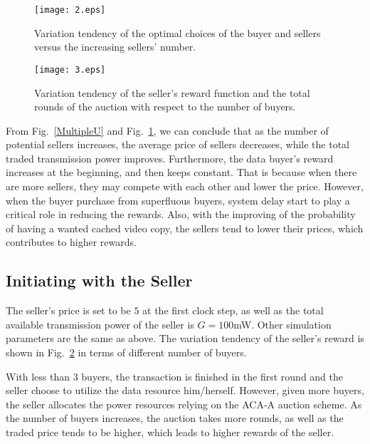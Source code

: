 \documentclass[11pt,draftcls]{IEEEtran}{\onecolumn}
\begin{document}
\begin{figure}
\begin{center}
\texttt{[image: 2.eps]}
\end{center}
\caption{Variation tendency of the optimal choices of the buyer and sellers versus the increasing sellers' number.}\label{MultipleE}
\end{figure}

\begin{figure}
\begin{center}
\texttt{[image: 3.eps]}
\end{center}
\caption{Variation tendency of the seller's reward function and the total rounds of the auction with respect to the number of buyers.}\label{auction1}
\end{figure}
From Fig.~\ref{MultipleU} and Fig.~\ref{MultipleE}, we can conclude that as the number of potential sellers increases, the average price of sellers decreases, while the total traded transmission power improves. Furthermore, the data buyer's reward increases at the beginning, and then keeps constant. That is because when there are more sellers, they may compete with each other and lower the price. However, when the buyer purchase from superfluous buyers, system delay start to play a critical role in reducing the rewards. Also, with the improving of the probability of having a wanted cached video copy, the sellers tend to lower their prices, which contributes to higher rewards.
\subsection{Initiating with the Seller}

The seller's price is set to be $5$ at the first clock step, as well as the total available transmission power of the seller is $G=100$mW. Other simulation parameters are the same as above. The variation tendency of the seller's reward is shown in Fig.~\ref{auction1} in terms of different number of buyers.

With less than $3$ buyers, the transaction is finished in the first round and the seller choose to utilize the data resource him/herself. However, given more buyers, the seller allocates the power resources relying on the ACA-A auction scheme. As the number of buyers increases, the auction takes more rounds, as well as the traded price tends to be higher, which leads to higher rewards of the seller.
\end{document}
